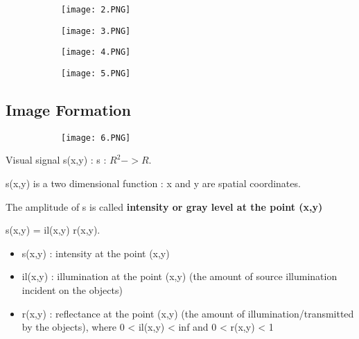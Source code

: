 \documentclass{article}
\begin{document}
\begin{figure}[ht!]
  \centering
  \begin{subfigure}[b]{0.4\linewidth}
    \texttt{[image: 2.PNG]}
  \end{subfigure}
  \begin{subfigure}[b]{0.4\textwidth}
         \centering
         \texttt{[image: 3.PNG]}
     \end{subfigure}
\end{figure}

\begin{figure}[ht!]
  \centering
  \begin{subfigure}[b]{0.4\linewidth}
    \texttt{[image: 4.PNG]}
  \end{subfigure}
  \begin{subfigure}[b]{0.4\textwidth}
         \centering
         \texttt{[image: 5.PNG]}
     \end{subfigure}
\end{figure}

\subsection{Image Formation}

\begin{figure}[ht!]
  \centering
  \begin{subfigure}[b]{0.4\linewidth}
    \texttt{[image: 6.PNG]}
  \end{subfigure}
\end{figure}

Visual signal s(x,y) : s : $R^2 -> R$.

s(x,y) is a two dimensional function : x and y are spatial coordinates.

The amplitude of s is called \textbf{intensity or gray level at the point (x,y)}

s(x,y) = il(x,y) r(x,y).

\begin{itemize}
    \item s(x,y) : intensity at the point (x,y) 
    \item il(x,y) : illumination at the point (x,y) (the amount of source illumination incident on the objects)
    \item r(x,y) : reflectance at the point (x,y) (the amount of illumination/transmitted by the objects), where 0 < il(x,y) < inf and 0 < r(x,y) < 1
\end{itemize}
\end{document}
